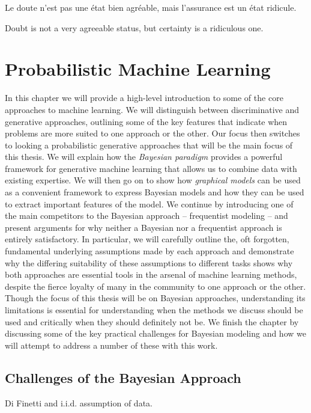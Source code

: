 
\begin{savequote}[8cm]
	\textlatin{Le doute n'est pas une état bien agréable, mais l'assurance est un état ridicule.}
	
	Doubt is not a very agreeable status, but certainty is a ridiculous one.
\end{savequote}


\chapter{Probabilistic Machine Learning}
\label{chp:bayes}

In this chapter we will provide a high-level introduction to  some of the core approaches to
machine learning.  We will distinguish between discriminative and generative approaches,
outlining some of the key features that indicate when problems are more suited to one approach
or the other.  Our focus then switches to looking a probabilistic generative approaches that
will be the main focus of this thesis.  We will explain how the \emph{Bayesian paradigm} provides
a powerful framework for generative machine learning that allows us to combine data with existing
expertise.  We will then go on to show how \emph{graphical models} can be used as a convenient
framework to express Bayesian models and how they can be used to extract important features of the
model.  We continue by introducing one of the main competitors to the Bayesian approach -- frequentist
modeling -- and present arguments for why neither a Bayesian nor a frequentist approach is
entirely satisfactory.  In particular, we will carefully outline the, oft forgotten, fundamental underlying
assumptions made by each approach and demonstrate why the differing suitability of these assumptions
to different tasks shows why both approaches are essential tools in the arsenal of machine learning
methods, despite the fierce loyalty of many in the community to one approach or the other.
Though the focus of this thesis will be on Bayesian approaches, understanding its limitations
is essential for understanding when the methods we discuss should be used and critically when they
should definitely not be.  We finish the chapter by discussing some of the key practical challenges
for Bayesian modeling and how we will attempt to address a number of these with this work.







\section{Challenges of the Bayesian Approach}
\label{sec:bayes:challenges}

Di Finetti and i.i.d. assumption of data.